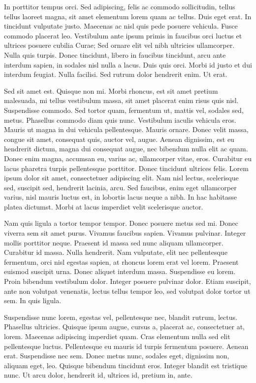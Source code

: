 \documentclass[12pt]{book}
\begin{document}
In porttitor tempus orci. Sed adipiscing, felis ac commodo sollicitudin, tellus tellus laoreet magna, sit amet elementum lorem quam ac tellus. Duis eget erat. In tincidunt vulputate justo. Maecenas ac nisl quis pede posuere vehicula. Fusce commodo placerat leo. Vestibulum ante ipsum primis in faucibus orci luctus et ultrices posuere cubilia Curae; Sed ornare elit vel nibh ultricies ullamcorper. Nulla quis turpis. Donec tincidunt, libero in faucibus tincidunt, arcu ante interdum sapien, in sodales nisl nulla a lacus. Duis quis orci. Morbi id justo et dui interdum feugiat. Nulla facilisi. Sed rutrum dolor hendrerit enim. Ut erat.

Sed sit amet est. Quisque non mi. Morbi rhoncus, est sit amet pretium malesuada, mi tellus vestibulum massa, sit amet placerat enim risus quis nisl. Suspendisse commodo. Sed tortor quam, fermentum ut, mattis vel, sodales sed, metus. Phasellus commodo diam quis nunc. Vestibulum iaculis vehicula eros. Mauris ut magna in dui vehicula pellentesque. Mauris ornare. Donec velit massa, congue sit amet, consequat quis, auctor vel, augue. Aenean dignissim, est eu hendrerit dictum, magna dui consequat augue, nec bibendum nulla elit ac quam. Donec enim magna, accumsan eu, varius ac, ullamcorper vitae, eros. Curabitur eu lacus pharetra turpis pellentesque porttitor. Donec tincidunt ultrices felis. Lorem ipsum dolor sit amet, consectetuer adipiscing elit. Nam nisl lectus, scelerisque sed, suscipit sed, hendrerit lacinia, arcu. Sed faucibus, enim eget ullamcorper varius, nisl mauris luctus est, in lobortis lacus neque a nibh. In hac habitasse platea dictumst. Morbi at lacus imperdiet velit scelerisque auctor.

Nam quis ligula a tortor tempor tempor. Donec posuere metus sed mi. Donec viverra sem sit amet purus. Vivamus faucibus sapien. Vivamus pulvinar. Integer mollis porttitor neque. Praesent id massa sed nunc aliquam ullamcorper. Curabitur id massa. Nulla hendrerit. Nam vulputate, elit nec pellentesque fermentum, orci nisl egestas sapien, at rhoncus lorem erat vel lorem. Praesent euismod suscipit urna. Donec aliquet interdum massa. Suspendisse eu lorem. Proin bibendum vestibulum dolor. Integer posuere pulvinar dolor. Etiam suscipit, ante non volutpat venenatis, lectus tellus tempor leo, sed volutpat dolor tortor ut sem. In quis ligula.

Suspendisse nunc lorem, egestas vel, pellentesque nec, blandit rutrum, lectus. Phasellus ultricies. Quisque ipsum augue, cursus a, placerat ac, consectetuer at, lorem. Maecenas adipiscing imperdiet quam. Cras elementum nulla sed elit pellentesque luctus. Pellentesque eu mauris id turpis fermentum posuere. Aenean erat. Suspendisse nec sem. Donec metus nunc, sodales eget, dignissim non, aliquam eget, leo. Quisque bibendum tincidunt eros. Integer blandit est tristique nunc. Ut arcu dolor, hendrerit id, ultrices id, pretium in, ante.
\end{document}
